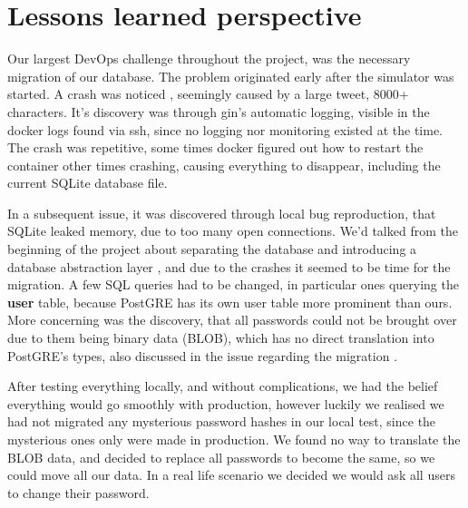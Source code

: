 \section{Lessons learned perspective}




Our largest DevOps challenge throughout the project, was the necessary migration of our database. The problem originated early after the simulator was started. A crash was noticed \cite{issue83}, seemingly caused by a large tweet, 8000+ characters. It's discovery was through gin's automatic logging, visible in the docker logs found via ssh, since no logging nor monitoring existed at the time. The crash was repetitive, some times docker figured out how to restart the container other times crashing, causing everything to disappear, including the current SQLite database file. 

In a subsequent issue\cite{issue86}, it was discovered through local bug reproduction, that SQLite leaked memory, due to too many open connections. We'd talked from the beginning of the project about separating the database and introducing a database abstraction layer \cite{issue37}, and due to the crashes it seemed to be time for the migration. A few SQL queries had to be changed, in particular ones querying the \textbf{user} table, because PostGRE has its own user table more prominent than ours. More concerning was the discovery, that all passwords could not be brought over due to them being binary data (BLOB), which has no direct translation into PostGRE's types, also discussed in the issue regarding the migration \cite{issue92}. 

After testing everything locally, and without complications, we had the belief everything would go smoothly with production, however luckily we realised we had not migrated any mysterious password hashes in our local test, since the mysterious ones only were made in production\cite{issue109}. We found no way to translate the BLOB data, and decided to replace all passwords to become the same, so we could move all our data. In a real life scenario we decided we would ask all users to change their password. 

